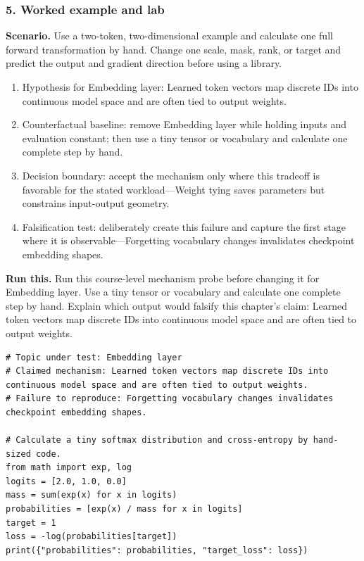 \subsubsection*{5. Worked example and lab}
\textbf{Scenario.} Use a two-token, two-dimensional example and calculate one full forward transformation by hand. Change one scale, mask, rank, or target and predict the output and gradient direction before using a library.
\begin{enumerate}
\item Hypothesis for Embedding layer: Learned token vectors map discrete IDs into continuous model space and are often tied to output weights.
\item Counterfactual baseline: remove Embedding layer while holding inputs and evaluation constant; then use a tiny tensor or vocabulary and calculate one complete step by hand.
\item Decision boundary: accept the mechanism only where this tradeoff is favorable for the stated workload—Weight tying saves parameters but constrains input-output geometry.
\item Falsification test: deliberately create this failure and capture the first stage where it is observable—Forgetting vocabulary changes invalidates checkpoint embedding shapes.
\end{enumerate}
\textbf{Run this.} Run this course-level mechanism probe before changing it for Embedding layer. Use a tiny tensor or vocabulary and calculate one complete step by hand. Explain which output would falsify this chapter's claim: Learned token vectors map discrete IDs into continuous model space and are often tied to output weights.
\begin{Verbatim}[fontsize=\scriptsize]
# Topic under test: Embedding layer
# Claimed mechanism: Learned token vectors map discrete IDs into continuous model space and are often tied to output weights.
# Failure to reproduce: Forgetting vocabulary changes invalidates checkpoint embedding shapes.

# Calculate a tiny softmax distribution and cross-entropy by hand-sized code.
from math import exp, log
logits = [2.0, 1.0, 0.0]
mass = sum(exp(x) for x in logits)
probabilities = [exp(x) / mass for x in logits]
target = 1
loss = -log(probabilities[target])
print({"probabilities": probabilities, "target_loss": loss})
\end{Verbatim}
